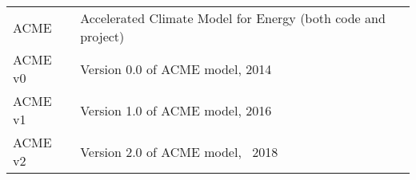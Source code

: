 \begin{tabular}{p{1.0in}p{5.4in}}
    ACME & Accelerated Climate Model for Energy (both code and project) \\
    ACME v0 & Version 0.0 of ACME model, 2014 \\
    ACME v1 & Version 1.0 of ACME model, 2016 \\
    ACME v2 & Version 2.0 of ACME model, ~2018 \\
\end{tabular}
